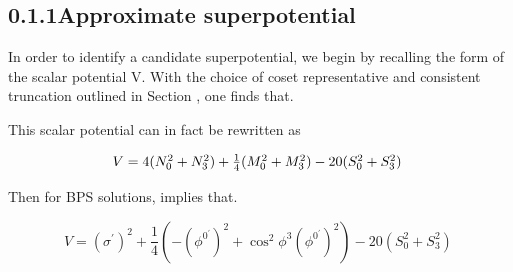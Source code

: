 \documentclass{article}
\begin{document}
\subsection*{0.1.1Approximate superpotential}


In order to identify a candidate superpotential, we begin by recalling the form of the scalar
potential V. With the choice of coset representative and consistent truncation outlined in
Section , one finds that.


This scalar potential can in fact be rewritten as


\begin{equation}
\begin{array} { c c } { V = 4 ( N _ { 0 } ^ { 2 } + N _ { 3 } ^ { 2 } ) + \frac { 1 } { 4 } ( M _ { 0 } ^ { 2 } + M _ { 3 } ^ { 2 } ) - 2 0 ( S _ { 0 } ^ { 2 } + S _ { 3 } ^ { 2 } ) ~ }\end{array}
\end{equation}


Then for BPS solutions, implies that.


\begin{equation}
V = ( \sigma ^ { \prime } ) ^ { 2 } + \frac { 1 } { 4 } \left ( - ( \phi ^ { 0 ^ { \prime } } ) ^ { 2 } + \cos ^ { 2 } \phi ^ { 3 } ( \phi ^ { 0 ^ { \prime } } ) ^ { 2 } \right ) - 2 0 ( S _ { 0 } ^ { 2 } + S _ { 3 } ^ { 2 } ) ~
\end{equation}
\end{document}
